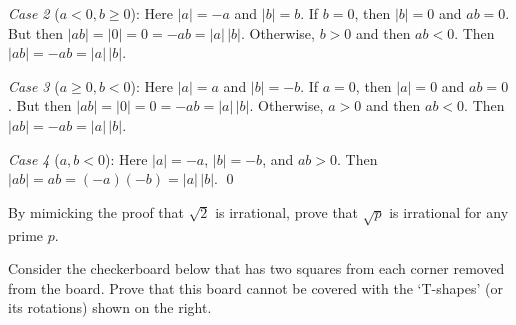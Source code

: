 \documentclass[11pt,letterpaper]{article}
\begin{document}
\textit{Case 2} ($a < 0, b \geq 0$): Here $|a|= -a$ and $|b|= b$. If $b= 0$, then $|b|= 0$ and $ab= 0$. But then $|ab|= |0|= 0 = -ab= |a| \,|b|$. Otherwise, $b > 0$ and then $ab < 0$. Then $|ab|= -ab= |a| \, |b|$. 

\textit{Case 3} ($a \geq 0, b < 0$): Here $|a|= a$ and $|b|= -b$. If $a= 0$, then $|a|= 0$ and $ab= 0$. But then $|ab|= |0|= 0= -ab= |a| \, |b|$. Otherwise, $a > 0$ and then $ab < 0$. Then $|ab|= -ab= |a| \, |b|$. 

\textit{Case 4} ($a, b < 0$): Here $|a|= -a$, $|b|= -b$, and $ab > 0$. Then $|ab|= ab= (-a)(-b)= |a| \, |b|$. \qed \pspace





\newpage





 By mimicking the proof that $\sqrt{2}$ is irrational, prove that $\sqrt{p}$ is irrational for any prime $p$. \pspace





\newpage





 Consider the checkerboard below that has two squares from each corner removed from the board. Prove that this board cannot be covered with the `T-shapes' (or its rotations) shown on the right. \pspace

\drawboard
\end{document}
